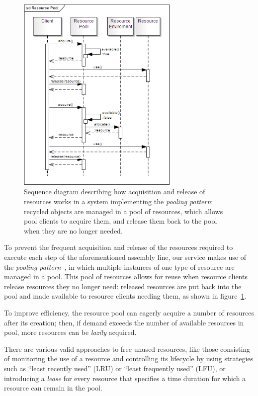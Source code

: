 \documentclass[11pt]{article}
\begin{document}
\begin{figure}[!ht]
\begin{center}
\includegraphics[width=7.75cm]{resource_pool}
\end{center}
\caption{Sequence diagram describing how acquisition and release of resources works in a system implementing the \emph{pooling pattern}: recycled objects are managed in a pool of resources, which allows pool clients to acquire them, and release them back to the pool when they are no longer needed.}
\label{fig:rp}
\end{figure}

To prevent the frequent acquisition and release of the resources required to execute each step of the aforementioned assembly line, our service makes use of the \emph{pooling pattern}~\citep{kircher2001}, in which multiple instances of one type of resource are managed in a pool. This pool of resources allows for reuse when resource clients release resources they no longer need: released resources are put back into the pool and made available to resource clients needing them, as shown in figure~\ref{fig:rp}.

To improve efficiency, the resource pool can eagerly acquire a number of resources after its creation; then, if demand exceeds the number of available resources in pool, more resources can be \emph{lazily} acquired.

There are various valid approaches to free unused resources, like those consisting of monitoring the use of a resource and controlling its lifecycle by using  strategies such as ``least recently used'' (LRU) or ``least frequently used'' (LFU), or introducing a \emph{lease} for every resource that specifies a time duration for which a resource can remain in the pool.
\end{document}
